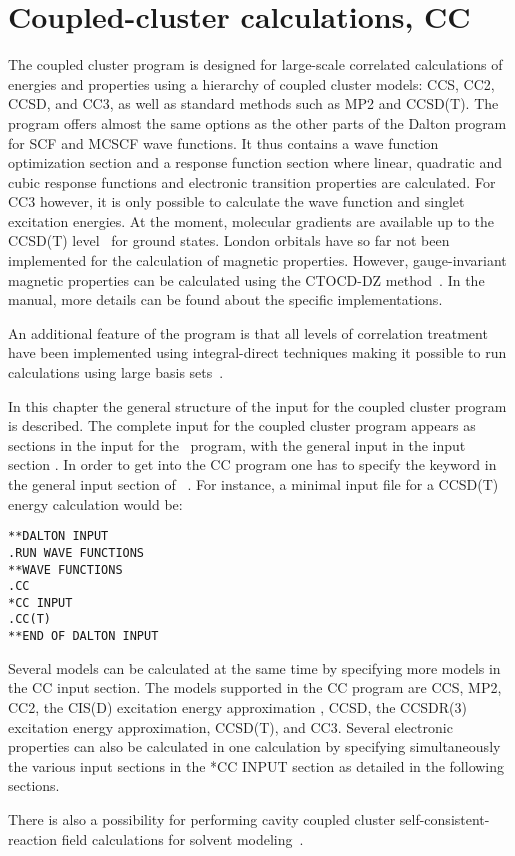 \chapter{Coupled-cluster calculations, CC}\label{ch:CC}

The coupled cluster program {\cc} is designed for large-scale
correlated calculations of energies and properties using a
hierarchy of coupled cluster models: CCS, CC2, CCSD, and CC3, as well as standard methods such as MP2 and CCSD(T).
The program offers almost the same options as the other
parts of the Dalton program for SCF and MCSCF wave functions.
It thus contains a wave function optimization section and 
a response function section
where linear, quadratic and cubic response functions and electronic
transition properties are calculated.
For CC3 however, it is only possible to calculate the wave function and 
singlet excitation energies.
At the moment, molecular gradients are available 
up to the CCSD(T) level~\cite{??} for ground states.  
London orbitals have so far not been implemented 
for the calculation of magnetic
properties.
However, gauge-invariant magnetic properties can be calculated using the
CTOCD-DZ method~\cite{ctocd,pccpcctocd}.
In the manual, more details can be found about the specific implementations.

An additional feature of the program is that all levels of correlation
treatment have been implemented using integral-direct techniques making
it possible to run calculations using large basis
sets~\cite{directCC}.

In this chapter the general structure of the input for the
coupled cluster program is described.
The complete input for the coupled cluster program appears as
sections in the input for the \sir\ program, with the general
input in the input section . In order to get into the CC program
one has to specify the  keyword in the general input
section of \sir\ . For instance, a minimal
input file for a CCSD(T) energy calculation would be:
\begin{verbatim}
**DALTON INPUT
.RUN WAVE FUNCTIONS
**WAVE FUNCTIONS
.CC
*CC INPUT
.CC(T)
**END OF DALTON INPUT
\end{verbatim}

Several models can be calculated at the same time by specifying more models
in the CC input section. 
The models supported in the CC program are 
CCS\cite{Christiansen:CPL243},
MP2\cite{Moller34},
CC2\cite{Christiansen:CPL243},
the CIS(D) excitation energy approximation \cite{Head-Gordon:94},
CCSD\cite{Purvis82},
the CCSDR(3) excitation energy approximation\cite{Christiansen:PERTURBATIVE_TRIPLES}, 
CCSD(T)\cite{Raghavachari89}, and CC3\cite{Christiansen:JCP103,Koch:JCP106}.
Several electronic properties can also 
be calculated in one calculation by specifying simultaneously 
the various input sections in the *CC INPUT section
as detailed in the following sections.

There is also a possibility for performing cavity coupled cluster
self-consistent-reaction field calculations for solvent modeling~\cite{???}.
